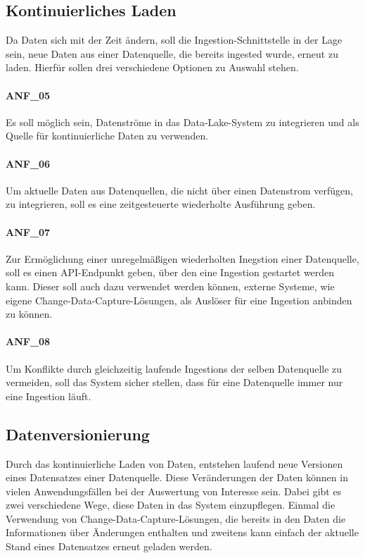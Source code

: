 \subsection{Kontinuierliches Laden}
Da Daten sich mit der Zeit ändern, soll die Ingestion-Schnittstelle in der Lage sein, neue Daten aus einer Datenquelle, die bereits ingested wurde, erneut zu laden.
Hierfür sollen drei verschiedene Optionen zu Auswahl stehen.

\paragraph{ANF\_05}
Es soll möglich sein, Datenströme in das Data-Lake-System zu integrieren und als Quelle für kontinuierliche Daten zu verwenden.

\paragraph{ANF\_06}
Um aktuelle Daten aus Datenquellen, die nicht über einen Datenstrom verfügen, zu integrieren, soll es eine zeitgesteuerte wiederholte Ausführung geben.

\paragraph{ANF\_07}
Zur Ermöglichung einer unregelmäßigen wiederholten Inegstion einer Datenquelle, soll es einen API-Endpunkt geben, über den eine Ingestion gestartet werden kann.
Dieser soll auch dazu verwendet werden können, externe Systeme, wie eigene Change-Data-Capture-Lösungen, als Auslöser für eine Ingestion anbinden zu können.

\paragraph{ANF\_08}
Um Konflikte durch gleichzeitig laufende Ingestions der selben Datenquelle zu vermeiden, soll das System sicher stellen, dass für eine Datenquelle immer nur eine Ingestion läuft.

\subsection{Datenversionierung}
Durch das kontinuierliche Laden von Daten, entstehen laufend neue Versionen eines Datensatzes einer Datenquelle.
Diese Veränderungen der Daten können in vielen Anwendungsfällen bei der Auswertung von Interesse sein.
Dabei gibt es zwei verschiedene Wege, diese Daten in das System einzupflegen.
Einmal die Verwendung von Change-Data-Capture-Lösungen, die bereits in den Daten die Informationen über Änderungen enthalten und zweitens kann einfach der aktuelle Stand eines Datensatzes erneut geladen werden.

